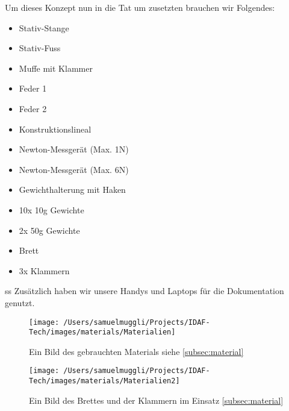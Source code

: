 \documentclass[../main.tex]{subfiles} %
\begin{document}
            Um dieses Konzept nun in die Tat um zusetzten brauchen wir Folgendes:
            \begin{itemize}
                \item \hypertarget{stativ-stange}{}Stativ-Stange \label{stativ-stange}
                \item \hypertarget{stativ-fuss}{}Stativ-Fuss \label{stativ-fuss}
                \item \hypertarget{muffe-mit-klammer}{}Muffe mit Klammer \label{muffe-mit-klammer}
                \item \hypertarget{feder-1}{}Feder 1 \label{feder-1}
                \item \hypertarget{feder-2}{}Feder 2 \label{feder-2}
                \item \hypertarget{konstruktionslineal}{}Konstruktionslineal \label{konstruktionslineal}
                \item \hypertarget{newton-messgerat-max-1n}{}Newton-Messgerät (Max. 1N) \label{newton-messgerat-max-1n}
                \item \hypertarget{newton-messgerat-max-6n}{}Newton-Messgerät (Max. 6N) \label{newton-messgerat-max-6n}
                \item \hypertarget{gewichthalterung-mit-haken}{}Gewichthalterung mit Haken \label{gewichthalterung-mit-haken}
                \item \hypertarget{10x-10g-gewichte}{}10x 10g Gewichte \label{10x-10g-gewichte}
                \item \hypertarget{2x-50g-gewichte}{}2x 50g Gewichte \label{2x-50g-gewichte}
                \item \hypertarget{brett}{}Brett \label{brett}
                \item \hypertarget{3x-klammern}{}3x Klammern \label{3x-klammern}
            \end{itemize}ss
            \noindent
            Zusätzlich haben wir unsere Handys und Laptops für die Dokumentation genutzt.

            \begin{figure}[H]
                \centering
                \texttt{[image: /Users/samuelmuggli/Projects/IDAF-Tech/images/materials/Materialien]}
                \caption{Ein Bild des gebrauchten Materials siehe \ref{subsec:material}}
                \label{fig:material}
            \end{figure}

            \begin{figure}[H]
                \centering
                \texttt{[image: /Users/samuelmuggli/Projects/IDAF-Tech/images/materials/Materialien2]}
                \caption{Ein Bild des Brettes und der Klammern im Einsatz \ref{subsec:material}}
                \label{fig:material2}
            \end{figure}
\end{document}
